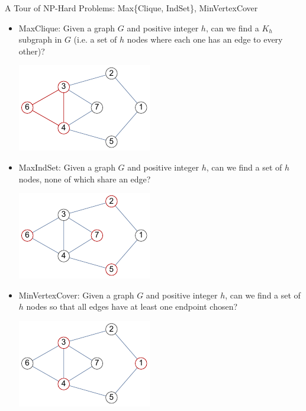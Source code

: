 \documentclass{beamer}
\begin{document}
\begin{frame}[t]{A Tour of NP-Hard Problems: Max\{Clique, IndSet\}, MinVertexCover}
    \begin{itemize}
        \item \alert{MaxClique}: Given a graph $G$ and positive integer $h$, can we find a $K_h$ subgraph in $G$ (i.e. a set of $h$ nodes where each one has an edge to every other)?
        \pause \begin{center}
            \includegraphics[width=0.22\linewidth]{clique.pdf}
        \end{center}
        \item \pause \alert{MaxIndSet}: Given a graph $G$ and positive integer $h$, can we find a set of $h$ nodes, none of which share an edge?
        \pause \begin{center}
            \includegraphics[width=.22\linewidth]{indset.pdf}
        \end{center}
        \item \pause \alert{MinVertexCover}: Given a graph $G$ and positive integer $h$, can we find a set of $h$ nodes so that all edges have at least one endpoint chosen?
        \pause \begin{center}
            \includegraphics[width=.22\linewidth]{vtxCover.pdf}
        \end{center}
        \end{itemize}
\end{frame}
\end{document}
